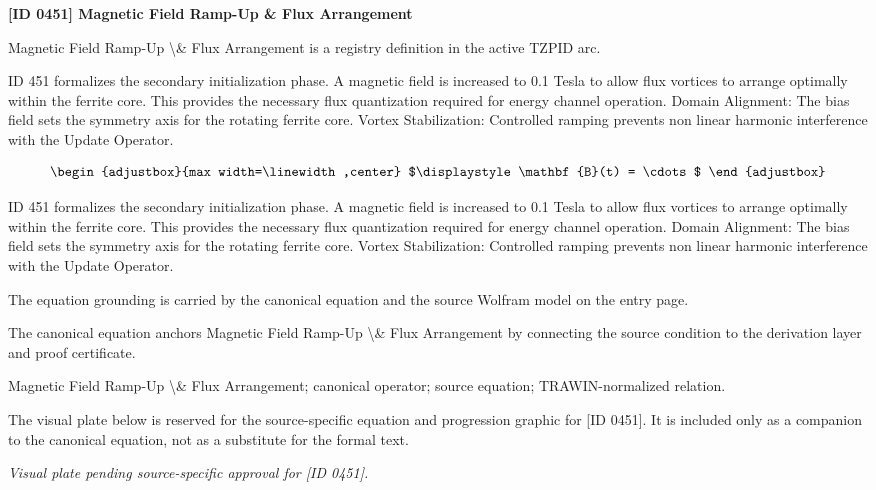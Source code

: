 \clearpage
\noindent\textbf{[ID 0451] Magnetic Field Ramp-Up \& Flux Arrangement}\par
\vspace{0.35em}
\begingroup\small
{}
Magnetic Field Ramp-Up \textbackslash{}\& Flux Arrangement is a registry definition in the active TZPID arc.

ID 451 formalizes the secondary initialization phase. A magnetic field is increased to 0.1 Tesla to allow flux vortices to arrange optimally within the ferrite core. This provides the necessary flux quantization required for energy channel operation. Domain Alignment: The bias field sets the symmetry axis for the rotating ferrite core. Vortex Stabilization: Controlled ramping prevents non linear harmonic interference with the Update Operator.

\[
\begin{adjustbox}{max width=\linewidth,center}
$\displaystyle
\mathbf{B}(t) = \cdots
$
\end{adjustbox}
\]

ID 451 formalizes the secondary initialization phase. A magnetic field is increased to 0.1 Tesla to allow flux vortices to arrange optimally within the ferrite core. This provides the necessary flux quantization required for energy channel operation. Domain Alignment: The bias field sets the symmetry axis for the rotating ferrite core. Vortex Stabilization: Controlled ramping prevents non linear harmonic interference with the Update Operator.

The equation grounding is carried by the canonical equation and the source Wolfram model on the entry page.

The canonical equation anchors Magnetic Field Ramp-Up \textbackslash{}\& Flux Arrangement by connecting the source condition to the derivation layer and proof certificate.

Magnetic Field Ramp-Up \textbackslash{}\& Flux Arrangement; canonical operator; source equation; TRAWIN-normalized relation.
\endgroup

\begingroup\footnotesize\sloppy
The visual plate below is reserved for the source-specific equation and progression graphic for [ID 0451]. It is included only as a companion to the canonical equation, not as a substitute for the formal text.
\par\endgroup
\begingroup\footnotesize\itshape
Visual plate pending source-specific approval for [ID 0451].
\par\endgroup

